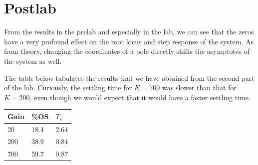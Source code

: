 \documentclass[12pt, a4paper]{article}
\begin{document}
	\section{Postlab} %
	\label{sec:postlab}
		From the results in the prelab and especially in the lab, we can see that the zeros have a very profound effect on the root locus and step response of the system. As from theory, changing the coordinates of a pole directly shifts the asymptotes of the system as well.

		The table below tabulates the results that we have obtained from the second part of the lab. Curiously, the settling time for $K = 700$ was slower than that for $K = 200$, even though we would expect that it would have a faster settling time.
		\begin{table}[H]
			\begin{tabularx}{\textwidth}{X X X}
				\toprule
				Gain & \%OS & $T_s$ \\
				\midrule
				20 & 18.4 & 2.64 \\
				200 & 38.9 & 0.84 \\
				700 & 59.7 & 0.87 \\
				\bottomrule
			\end{tabularx}
		\end{table}
\end{document}

